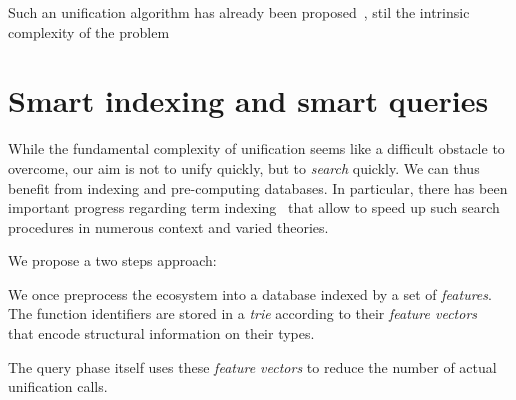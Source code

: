 \documentclass [a4paper,11pt]{scrartcl}
\begin{document}
Such an unification algorithm has already been proposed~\cite {boudet}, stil the intrinsic complexity of the problem 




\section{Smart indexing and smart queries}

While the fundamental complexity of unification seems like a difficult
obstacle to overcome, our aim is not to unify quickly, but to \emph{search}
quickly. We can thus benefit from indexing and pre-computing databases.
In particular, there has been important progress regarding
term indexing~\cite{schulz,DBLP:books/el/RV01/RamakrishnanSV01} that allow
to speed up such search procedures in numerous context and varied theories.


We propose a two steps approach:
\begin{compactitem}
\item We once preprocess the ecosystem into a database indexed by a set of \emph{features}. The function identifiers are stored in a \textit{trie} according to their \textit{feature vectors}~\cite{schulz} that encode structural information on their types.
\item The query phase itself uses these \emph{feature vectors} to reduce the number of actual unification calls.
\end{compactitem}

\end{document}
